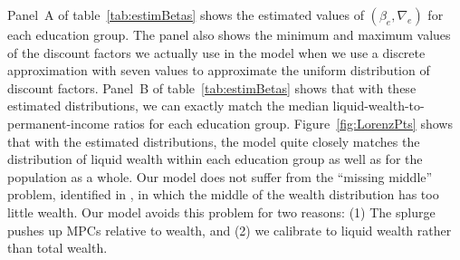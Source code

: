 \documentclass[\econtexRoot/HAFiscal]{subfiles}
\begin{document}
Panel~A of table~\ref{tab:estimBetas} shows the estimated values of $(\beta_e, \nabla_e)$ for each education group.
The panel also shows the minimum and maximum values of the discount factors we actually use in the model when we use a discrete approximation with seven values to approximate the uniform distribution of discount factors.
Panel~B of table~\ref{tab:estimBetas} shows that with these estimated distributions, we can exactly match the median liquid-wealth-to-permanent-income ratios for each education group.
Figure~\ref{fig:LorenzPts} shows that with the estimated distributions, the model quite closely matches the distribution of liquid wealth within each education group as well as for the population as a whole.
Our model does not suffer from the ``missing middle'' problem, identified in \cite{kaplanMPC2022}, in which the middle of the wealth distribution has too little wealth.
Our model avoids this problem for two reasons: (1) The splurge pushes up MPCs relative to wealth, and (2) we calibrate to liquid wealth rather than total wealth.
\end{document}
